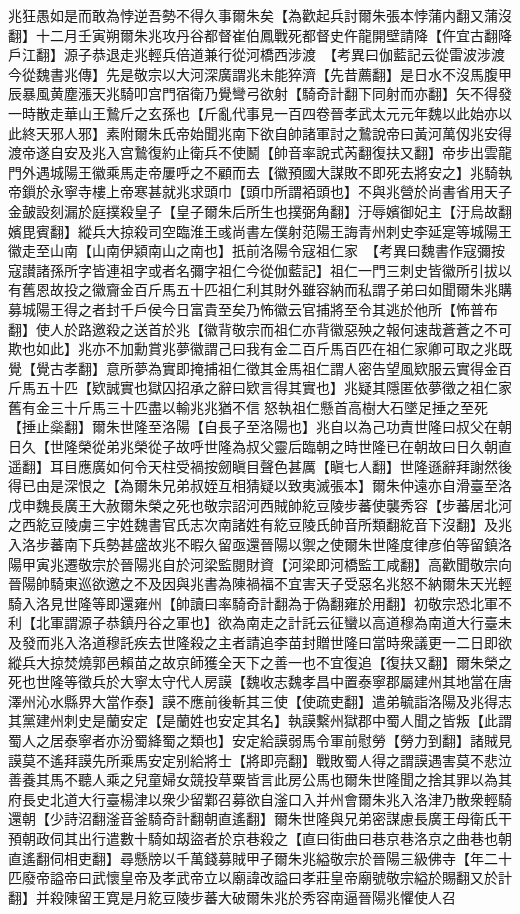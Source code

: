 兆狂愚如是而敢為悖逆吾勢不得久事爾朱矣【為歡起兵討爾朱張本悖蒲内翻又蒲沒翻】十二月壬寅朔爾朱兆攻丹谷都督崔伯鳳戰死都督史仵龍開壁請降【仵宜古翻降戶江翻】源子恭退走兆輕兵倍道兼行從河橋西涉渡　【考異曰伽藍記云從雷波涉渡今從魏書兆傳】先是敬宗以大河深廣謂兆未能猝濟【先昔薦翻】是日水不沒馬腹甲辰暴風黄塵漲天兆騎叩宫門宿衛乃覺彎弓欲射【騎奇計翻下同射而亦翻】矢不得發一時散走華山王鷙斤之玄孫也【斤亂代事見一百四卷晉孝武太元元年魏以此始亦以此終天邪人邪】素附爾朱氏帝始聞兆南下欲自帥諸軍討之鷙說帝曰黃河萬仭兆安得渡帝遂自安及兆入宫鷙復約止衛兵不使鬭【帥音率說式芮翻復扶又翻】帝步出雲龍門外遇城陽王徽乘馬走帝屢呼之不顧而去【徽預國大謀敗不即死去將安之】兆騎執帝鎻於永寧寺樓上帝寒甚就兆求頭巾【頭巾所謂袹頭也】不與兆營於尚書省用天子金皷設刻漏於庭撲殺皇子【皇子爾朱后所生也撲弼角翻】汙辱嬪御妃主【汙烏故翻嬪毘賓翻】縱兵大掠殺司空臨淮王彧尚書左僕射范陽王誨青州刺史李延寔等城陽王徽走至山南【山南伊潁南山之南也】扺前洛陽令寇祖仁家　【考異曰魏書作寇彌按寇讃諸孫所字皆連祖字或者名彌字祖仁今從伽藍記】祖仁一門三刺史皆徽所引拔以有舊恩故投之徽齎金百斤馬五十匹祖仁利其財外雖容納而私謂子弟曰如聞爾朱兆購募城陽王得之者封千戶侯今日富貴至矣乃怖徽云官捕將至令其逃於他所【怖普布翻】使人於路邀殺之送首於兆【徽背敬宗而祖仁亦背徽惡殃之報何速哉蒼蒼之不可欺也如此】兆亦不加勳賞兆夢徽謂己曰我有金二百斤馬百匹在祖仁家卿可取之兆既覺【覺古孝翻】意所夢為實即掩捕祖仁徵其金馬祖仁謂人密告望風欵服云實得金百斤馬五十匹【欵誠實也獄囚招承之辭曰欵言得其實也】兆疑其隱匿依夢徵之祖仁家舊有金三十斤馬三十匹盡以輸兆兆猶不信怒執祖仁懸首高樹大石墜足捶之至死【捶止橤翻】爾朱世隆至洛陽【自長子至洛陽也】兆自以為己功責世隆曰叔父在朝日久【世隆榮從弟兆榮從子故呼世隆為叔父靈后臨朝之時世隆已在朝故曰日久朝直遥翻】耳目應廣如何令天柱受禍按劒瞋目聲色甚厲【瞋七人翻】世隆遜辭拜謝然後得已由是深恨之【為爾朱兄弟叔姪互相猜疑以致夷滅張本】爾朱仲遠亦自滑臺至洛戊申魏長廣王大赦爾朱榮之死也敬宗詔河西賊帥紇豆陵步蕃使襲秀容【步蕃居北河之西紇豆陵虜三宇姓魏書官氏志次南諸姓有紇豆陵氏帥音所類翻紇音下沒翻】及兆入洛步蕃南下兵勢甚盛故兆不暇久留亟還晉陽以禦之使爾朱世隆度律彦伯等留鎮洛陽甲寅兆遷敬宗於晉陽兆自於河梁監閱財資【河梁即河橋監工咸翻】高歡聞敬宗向晉陽帥騎東巡欲邀之不及因與兆書為陳禍福不宜害天子受惡名兆怒不納爾朱天光輕騎入洛見世隆等即還雍州【帥讀曰率騎奇計翻為于偽翻雍於用翻】初敬宗恐北軍不利【北軍謂源子恭鎮丹谷之軍也】欲為南走之計託云征蠻以高道穆為南道大行臺未及發而兆入洛道穆託疾去世隆殺之主者請追李苗封贈世隆曰當時衆議更一二日即欲縱兵大掠焚燒郭邑賴苗之故京師獲全天下之善一也不宜復追【復扶又翻】爾朱榮之死也世隆等徵兵於大寧太守代人房謨【魏收志魏孝昌中置泰寧郡屬建州其地當在唐澤州沁水縣界大當作泰】謨不應前後斬其三使【使疏吏翻】遣弟毓詣洛陽及兆得志其黨建州刺史是蘭安定【是蘭姓也安定其名】執謨繫州獄郡中蜀人聞之皆叛【此謂蜀人之居泰寧者亦汾蜀絳蜀之類也】安定給謨弱馬令軍前慰勞【勞力到翻】諸賊見謨莫不遙拜謨先所乘馬安定别給將士【將即亮翻】戰敗蜀人得之謂謨遇害莫不悲泣善養其馬不聽人乘之兒童婦女競投草粟皆言此房公馬也爾朱世隆聞之捨其罪以為其府長史北道大行臺楊津以衆少留鄴召募欲自滏口入并州會爾朱兆入洛津乃散衆輕騎還朝【少詩沼翻滏音釜騎奇計翻朝直遙翻】爾朱世隆與兄弟密謀慮長廣王母衛氏干預朝政伺其出行遣數十騎如刼盜者於京巷殺之【直曰街曲曰巷京巷洛京之曲巷也朝直遙翻伺相吏翻】尋懸牓以千萬錢募賊甲子爾朱兆縊敬宗於晉陽三級佛寺【年二十匹廢帝謚帝曰武懷皇帝及孝武帝立以廟諱改謚曰孝莊皇帝廟號敬宗縊於賜翻又於計翻】并殺陳留王寛是月紇豆陵步蕃大破爾朱兆於秀容南逼晉陽兆懼使人召